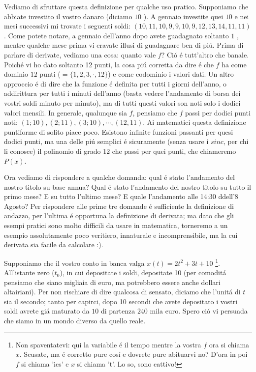 Vediamo di sfruttare questa definizione per qualche uso pratico. Supponiamo che abbiate investito il vostro danaro (diciamo $10$ \EUR).
A gennaio investite quei $10$ e nei mesi successivi mi trovate i seguenti soldi: $(10,11,10,9,9,10,9,12,13,14,11,11)$. Come potete notare,
a gennaio dell'anno dopo avete guadagnato soltanto $1$ \EUR, mentre qualche mese prima vi eravate illusi di guadagnare ben di pi\'u. Prima di
parlare di derivate, vediamo una cosa: quanto vale $f$? Ci\'o \'e tutt'altro che banale. Poich\'e vi ho dato soltanto 12 punti, la cosa pi\'u
corretta da dire \'e che $f$ ha come dominio $12$ punti ($= \{1,2,3,\cdot,12\}$) e come codominio i valori dati. Un altro approccio \'e di dire
che la funzione \'e definita per tutti i giorni dell'anno, o addirittura per tutti i minuti dell'anno (basta vedere l'andamento di borsa dei
vostri soldi minuto per minuto), ma di tutti questi valori son noti solo i dodici valori mensili. In generale, qualunque sia $f$, pensiamo
che $f$ passi per dodici punti noti: $(1;10),(2;11),(3;10),\cdots,(12,11)$. Ai matematici questa definizione puntiforme di solito piace poco.
Esistono infinite funzioni passanti per quesi dodici punti, ma una delle pi\'u semplici \'e sicuramente (senza usare i $sinc$, per chi li
conosce) il polinomio di grado $12$ che passi per quei punti, che chiameremo $P(x)$.

Ora vediamo di rispondere a qualche domanda: qual \'e stato l'andamento del nostro titolo su base annua? Qual \'e stato l'andamento del
nostro titolo su tutto il primo mese? E su tutto l'ultimo mese? E quale l'andamento alle 14:30 ddell'8 Agosto? Per rispondere alle prime
tre domande \'e sufficiente la definizione di andazzo, per l'ultima \'e opportuna la definizione di derivata; ma dato che gli esempi
pratici sono molto difficili da usare in matematica, torneremo a un esempio assolutamente poco veritiero, innaturale e incomprensibile,
ma la cui derivata sia facile da calcolare :).

Supponiamo che il vostro conto in banca valga $x(t)=2t^2+3t+10$ \footnote{Non spaventatevi: qui la variabile \'e il tempo mentre la
vostra $f$ ora si chiama $x$.
Scusate, ma \'e corretto pure cos\'i e dovrete pure abituarvi no? D'ora in poi $f$ si chiama 'ics' e $x$ si chiama 't'. Lo so, sono cattivo!}.
All'istante zero ($t_0$), in cui depositate i soldi, depositate 10 (per comodit\'a pensiamo che siano migliaia di euro, ma potrebbero essere
anche dollari altairiani). Per non rischiare di dire qualcosa di sensato, diciamo che l'unit\'a di $t$ sia il secondo; tanto per capirci,
dopo 10 secondi che avete depositato i vostri soldi avrete gi\'a maturato da $10$ di partenza $240$ mila euro. Spero ci\'o vi persuada che
siamo in un mondo diverso da quello reale.

